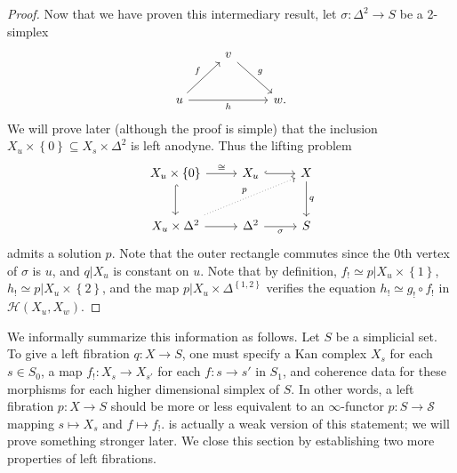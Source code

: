 \begin{proof}
	Now that we have proven this intermediary result, let $\sigma : \Delta ^2 \to S$ be a 2-simplex
	\[\begin{tikzcd}[row sep = 2.5em, column sep = 2.5em]
	 & v \ar[" g ", dr]  &  \\
	u \ar[" f ", ur] \ar[" h "', rr]  &  & w.
	\end{tikzcd}\]
	We will prove later (although the proof is simple) that the inclusion $X_u\times \left\{ 0 \right\} \subseteq X_s \times \Delta ^2$ is left anodyne. Thus the lifting problem
	\[\begin{tikzcd}[row sep = 2.5em, column sep = 2.5em]
	X_u\times \left\{ 0 \right\} \ar[" \cong  ", r]\ar[hook, d]   & X_u \ar[hook, r]  & X \ar[" q ", d]  \\
	X_u\times \Delta ^2 \ar[r] \ar[" p ", dotted, urr]  & \Delta ^2 \ar[" \sigma  "', r]  & S
	\end{tikzcd}\]
	admits a solution $p$. Note that the outer rectangle commutes since the 0th vertex of $\sigma $ is $u$, and $q|X_u$ is constant on $u$. Note that by definition, $f_! \simeq p|X_u \times \left\{ 1 \right\} $, $h_! \simeq p|X_u\times \left\{ 2 \right\} $, and the map $p|X_u\times \Delta ^{\left\{ 1,2 \right\} } $ verifies the equation $h_! \simeq g_! \circ f_!$ in $\mathcal{H} (X_u,X_w)$.
\end{proof}

We informally summarize this information as follows. Let $S$ be a simplicial set. To give a left fibration $q : X \to S$, one must specify a Kan complex $X_s$ for each $s\in S_0$, a map $f_! : X_s \to X_{s'} $ for each $f : s \to s'$ in $S_1$, and coherence data for these morphisms for each higher dimensional simplex of $S$. In other words, a left fibration $p : X \to S$ should be more or less equivalent to an $\infty $-functor $p : S \to \mathcal{S} $ mapping $s\mapsto X_s$ and $f\mapsto f_!$.  is actually a weak version of this statement; we will prove something stronger later. We close this section by establishing two more properties of left fibrations.

